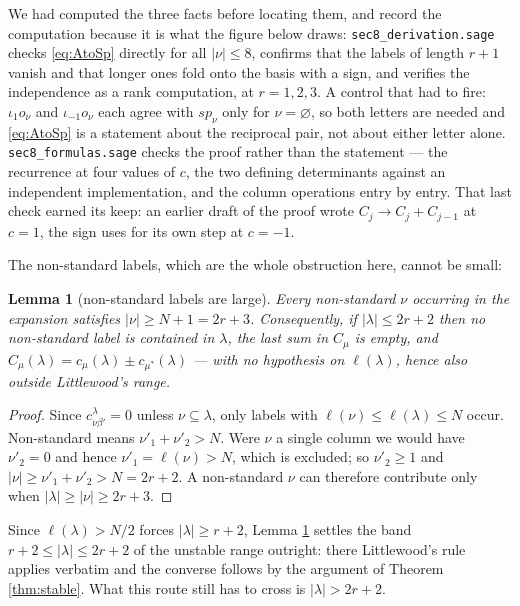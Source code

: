 \documentclass[11pt,reqno]{amsart}
\theoremstyle{plain}
\newtheorem{lemma}[theorem]{Lemma}
\theoremstyle{definition}
\begin{document}
We had computed the three facts before locating them, and record the computation because it is what
the figure below draws: \texttt{sec8\_derivation.sage} checks \eqref{eq:AtoSp} directly for all
$|\nu|\le8$, confirms that the labels of length $r+1$ vanish and that longer ones fold onto the basis
with a sign, and verifies the independence as a rank computation, at $r=1,2,3$. A control that had to
fire: $\iota_1 o_\nu$ and $\iota_{-1}o_\nu$ each agree with $sp_\nu$ only for $\nu=\varnothing$, so
both letters are needed and \eqref{eq:AtoSp} is a statement about the reciprocal pair, not about
either letter alone. \texttt{sec8\_formulas.sage} checks the proof rather than the statement --- the
recurrence at four values of $c$, the two defining determinants against an independent
implementation, and the column operations entry by entry. That last check earned its keep: an earlier
draft of the proof wrote $C_j\to C_j+C_{j-1}$ at $c=1$, the sign \cite[Lemma 3.2]{AK25} uses for its
own step at $c=-1$.

The non-standard labels, which are the whole obstruction here, cannot be small:

\begin{lemma}[non-standard labels are large]\label{lem:nonstd}
Every non-standard $\nu$ occurring in the expansion satisfies $|\nu|\ge N+1=2r+3$. Consequently, if
$|\lambda|\le2r+2$ then no non-standard label is contained in $\lambda$, the last sum in $C_\mu$ is
empty, and $C_\mu(\lambda)=c_\mu(\lambda)\pm c_{\mu^{*}}(\lambda)$ --- with no hypothesis on
$\ell(\lambda)$, hence also outside Littlewood's range.
\end{lemma}

\begin{proof}
Since $c^{\lambda}_{\nu\beta'}=0$ unless $\nu\subseteq\lambda$, only labels with
$\ell(\nu)\le\ell(\lambda)\le N$ occur. Non-standard means $\nu'_1+\nu'_2>N$. Were $\nu$ a single
column we would have $\nu'_2=0$ and hence $\nu'_1=\ell(\nu)>N$, which is excluded; so $\nu'_2\ge1$ and
$|\nu|\ge\nu'_1+\nu'_2>N=2r+2$. A non-standard $\nu$ can therefore contribute only when
$|\lambda|\ge|\nu|\ge2r+3$.
\end{proof}

\noindent Since $\ell(\lambda)>N/2$ forces $|\lambda|\ge r+2$, Lemma \ref{lem:nonstd} settles the
band $r+2\le|\lambda|\le2r+2$ of the unstable range outright: there Littlewood's rule applies
verbatim and the converse follows by the argument of Theorem \ref{thm:stable}. What this route still
has to cross is $|\lambda|>2r+2$.
\end{document}
